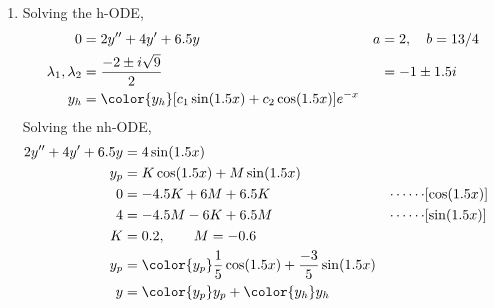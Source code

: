 \begin{enumerate}
    \item Solving the h-ODE,
          \begin{align}
              0                        & = 2y'' + 4y' + 6.5y                                     & a & = 2, \quad b = 13/4 \\
              \lambda_{1}, \lambda_{2} & = \frac{-2 \pm i\sqrt{9}}{2}                            &   & = -1 \pm 1.5i       \\
              y_{h}                    & = \color{y_h} [c_{1}\sin(1.5x) + c_{2}\cos(1.5x)]e^{-x}
          \end{align}
          Solving the nh-ODE,
          \begin{align}
              2y'' + 4y' + 6.5y & = 4\sin(1.5x)                                                                              \\
              y_{p}             & = K \cos(1.5x) + M \sin(1.5x)                                                              \\
              0                 & = -4.5K + 6M + 6.5K                                          & \cdots\cdots & [\cos(1.5x)] \\
              4                 & = -4.5M - 6K + 6.5M                                          & \cdots\cdots & [\sin(1.5x)] \\
              K                 & = 0.2, \qquad M = -0.6                                                                     \\
              y_{p}             & = \color{y_p} \frac{1}{5}\cos(1.5x) + \frac{-3}{5}\sin(1.5x)                               \\
              y                 & = {\color{y_p} y_{p}} + {\color{y_h} y_{h}}
          \end{align}


\end{enumerate}
